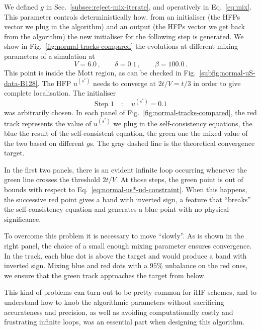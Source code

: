 We defined $g$ in Sec.~\ref{subsec:reject-mix-iterate}, and operatively in Eq.~\eqref{eq:mix}. This parameter controls deterministically how, from an initialiser (the HFPs vector we plug in the algorithm) and an output (the HFPs vector we get back from the algorithm) the new initialiser for the following step is generated. We show in Fig.~\ref{fig:normal-tracks-compared} the evolutions at different mixing parameters of a simulation at
\[
	V = 6.0 \, ,
	\qquad
	\delta = 0.1 \, ,
	\qquad
	\beta = 100.0 \, .
\]
This point is inside the Mott region, as can be checked in Fig.~\ref{subfig:normal-uS-data-B128}. The HFP $u^{(s^*)}$ needs to converge at $2t/V=t/3$ in order to give complete localisation. The initialiser
\[
	\text{Step $1$}
	\quad\colon\quad
	u^{(s^*)} = 0.1
\]
was arbitrarily chosen. In each panel of Fig.~\ref{fig:normal-tracks-compared}, the red track represents the value of $u^{(s^*)}$ we plug in the self-consistency equations, the blue the result of the self-consistent equation, the green one the mixed value of the two based on different $g$s. The gray dashed line is the theoretical convergence target. 

In the first two panels, there is an evident infinite loop occurring whenever the green line crosses the threshold $2t/V$. At those steps, the green point is out of bounds with respect to Eq.~\eqref{eq:normal-us*-ud-constraint}. When this happens, the successive red point gives a band with inverted sign, a feature that ``breaks'' the self-consistency equation and generates a blue point with no physical significance.

To overcome this problem it is necessary to move ``slowly''. As is shown in the right panel, the choice of a small enough mixing parameter ensures convergence. In the track, each blue dot is above the target and would produce a band with inverted sign. Mixing blue and red dots with a $95\%$ unbalance on the red ones, we ensure that the green track approaches the target from below.

This kind of problems can turn out to be pretty common for iHF schemes, and to understand how to knob the algorithmic parameters without sacrificing accurateness and precision, as well as avoiding computationally costly and frustrating infinite loops, was an essential part when designing this algorithm.